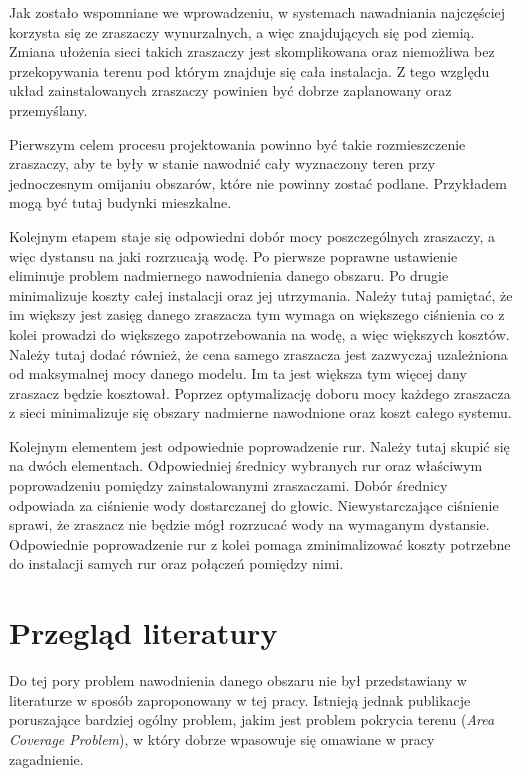 \documentclass[twoside]{iisthesis}
\begin{document}
Jak zostało wspomniane we wprowadzeniu, w systemach nawadniania najczęściej korzysta się ze zraszaczy wynurzalnych, a więc znajdujących się pod ziemią. Zmiana ułożenia sieci takich zraszaczy jest skomplikowana oraz niemożliwa bez przekopywania terenu pod którym znajduje się cała instalacja. Z tego względu układ zainstalowanych zraszaczy powinien być dobrze zaplanowany oraz przemyślany.

Pierwszym celem procesu projektowania powinno być takie rozmieszczenie zraszaczy, aby te były w stanie nawodnić cały wyznaczony teren przy jednoczesnym omijaniu obszarów, które nie powinny zostać podlane. Przykładem mogą być tutaj budynki mieszkalne.

Kolejnym etapem staje się odpowiedni dobór mocy poszczególnych zraszaczy, a więc dystansu na jaki rozrzucają wodę. Po pierwsze poprawne ustawienie eliminuje problem nadmiernego nawodnienia danego obszaru. Po drugie minimalizuje koszty całej instalacji oraz jej utrzymania. Należy tutaj pamiętać, że im większy jest zasięg danego zraszacza tym wymaga on większego ciśnienia co z kolei prowadzi do większego zapotrzebowania na wodę, a więc większych kosztów. Należy tutaj dodać również, że cena samego zraszacza jest zazwyczaj uzależniona od maksymalnej mocy danego modelu. Im ta jest większa tym więcej dany zraszacz będzie kosztował. Poprzez optymalizację doboru mocy każdego zraszacza z sieci minimalizuje się obszary nadmierne nawodnione oraz koszt całego systemu.

Kolejnym elementem jest odpowiednie poprowadzenie rur. Należy tutaj skupić się na dwóch elementach. Odpowiedniej średnicy wybranych rur oraz właściwym poprowadzeniu pomiędzy zainstalowanymi zraszaczami. Dobór średnicy odpowiada za ciśnienie wody dostarczanej do głowic. Niewystarczające ciśnienie sprawi, że zraszacz nie będzie mógł rozrzucać wody na wymaganym dystansie. Odpowiednie poprowadzenie rur z kolei pomaga zminimalizować koszty potrzebne do instalacji samych rur oraz połączeń pomiędzy nimi.

\section{Przegląd literatury}
Do tej pory problem nawodnienia danego obszaru nie był przedstawiany w literaturze w sposób zaproponowany w tej pracy. Istnieją jednak publikacje poruszające bardziej ogólny problem, jakim jest problem pokrycia terenu (\textit{Area Coverage Problem}), w który dobrze wpasowuje się omawiane w pracy zagadnienie.
\end{document}
